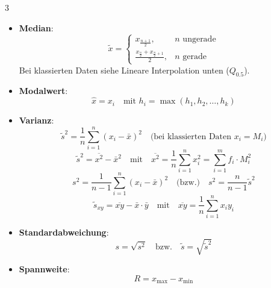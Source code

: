 \documentclass[10pt,a4paper,landscape]{article}
\begin{document}
\begin{multicols*}{3}
{\begin{itemize}
					 \item \textbf{Median}:
					       \begin{equation*}
						       \tilde{x} =
						       \begin{cases}
							       x_{\frac{n+1}{2}},                             & n \text{ ungerade} \\
							       \frac{x_{\frac{n}{2}} + x_{\frac{n}{2}+1}}{2}, & n \text{ gerade}
						       \end{cases}
					       \end{equation*}
					       Bei klassierten Daten siehe Lineare Interpolation unten ($Q_{0.5}$).
					 \item \textbf{Modalwert}:
					       \begin{equation*}
						       \hat{x} = x_i \quad \text{mit } h_i = \max(h_1, h_2, \ldots, h_k)
					       \end{equation*}
					 \item \textbf{Varianz}:
					       \begin{equation*}
						       \tilde{s}^2 = \frac{1}{n} \sum_{i=1}^{n} {(x_i - \bar{x})}^2 \quad \text{(bei klassierten Daten $x_i = M_i$)}
					       \end{equation*}
					       \begin{equation*}
						       \tilde{s}^2 = \overline{x^2} - \bar{x}^2 \quad \text{mit} \quad \overline{x^2} = \frac{1}{n} \sum_{i=1}^{n} x_i^2 = \sum_{i=1}^{m} f_i \cdot M_i^2
					       \end{equation*}
					       \begin{equation*}
						       s^2 = \frac{1}{n-1} \sum_{i=1}^{n} {(x_i - \bar{x})}^2 \quad  \text{(bzw.)} \quad s^2 = \frac{n}{n-1} \tilde{s}^2
					       \end{equation*}
					       \begin{equation*}
						       \tilde{s}_{xy} = \overline{xy} - \bar{x} \cdot \bar{y} \quad \text{mit} \quad \overline{xy} = \frac{1}{n} \sum_{i=1}^{n} x_i y_i
					       \end{equation*}
					 \item \textbf{Standardabweichung}:
					       \begin{equation*}
						       s = \sqrt{s^2} \quad \text{bzw.} \quad \tilde{s} = \sqrt{\tilde{s}^2}
					       \end{equation*}
					 \item \textbf{Spannweite}:
					       \begin{equation*}
						       R = x_{\max} - x_{\min}
					       \end{equation*}

\end{itemize}}
\end{multicols*}
\end{document}
